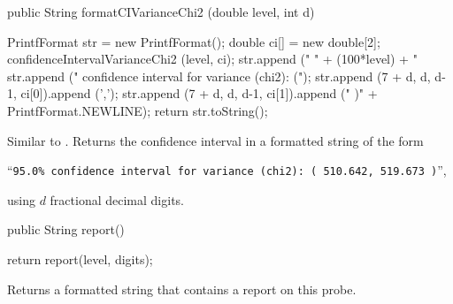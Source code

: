 \begin{htmlonly}
\end{htmlonly}
\begin{code}

   public String formatCIVarianceChi2 (double level, int d) \begin{hide} {
      PrintfFormat str = new PrintfFormat();
      double ci[] = new double[2];
      confidenceIntervalVarianceChi2 (level, ci);
      str.append ("  " + (100*level) + "%
      str.append (" confidence interval for variance (chi2): (");
      str.append (7 + d, d, d-1, ci[0]).append (',');
      str.append (7 + d, d, d-1, ci[1]).append (" )" + PrintfFormat.NEWLINE);
      return str.toString();
}\end{hide}
\end{code}
\begin{tabb}  Similar to .
   Returns the confidence interval in a formatted string of the form \\
\centerline{``\texttt{95.0\% confidence interval for variance (chi2):
   ( 510.642,  519.673 )}'',}
   using $d$ fractional decimal digits.
\end{tabb}
\begin{htmlonly}
\end{htmlonly}
\begin{code}

   public String report() \begin{hide} {
      return report(level, digits);
   }\end{hide}
\end{code}
 \begin{tabb}  Returns a formatted string that contains a report on this probe.
 \end{tabb}
\begin{htmlonly}
\end{htmlonly}
